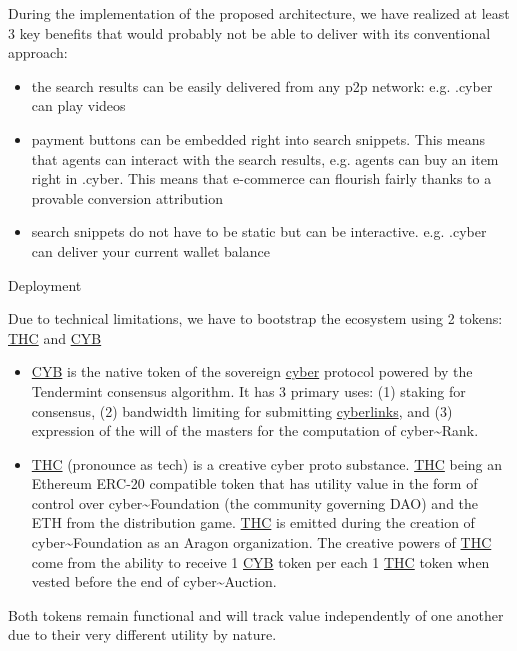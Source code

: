 \documentclass[8pt,oneside]{amsart}
\makeatletter
\newcommand{\linkred}[2]{\href{#1}{\color{red}{#2}}}
\renewcommand\subsection{\@startsection{subsection}
                                    {2}{\z@}
                                    {-3.25ex\@plus -1ex \@minus -.2ex}
                                    {0ex \@plus .2ex}
                                    {\play\Large}
                        }
\newcommand{\titleSection}[1]{\subsection{#1}}
\makeatother
\begin{document}
During the implementation of the proposed architecture, we have realized at least 3 key benefits that \linkred{https://google.com}{Google} would probably not be able to deliver with its conventional approach:

\begin{itemize}
\item the search results can be easily delivered from any p2p network: e.g. .cyber can play videos
\item payment buttons can be embedded right into search snippets. This means that agents can interact with the search results, e.g. agents can buy an item right in .cyber. This means that e-commerce can flourish fairly thanks to a provable conversion attribution
\item search snippets do not have to be static but can be interactive. e.g. .cyber can deliver your current wallet balance
\end{itemize}

\titleSection{Deployment}\label{deployment}

Due to technical limitations, we have to bootstrap the ecosystem using 2 tokens: {\hyperref[thc]{THC}} and {\hyperref[cyb]{CYB}}

\begin{itemize}
\item {\hyperref[cyb]{CYB}} is the native token of the sovereign {\hyperref[cyber]{cyber}} protocol powered by the Tendermint consensus algorithm. It has 3 primary uses: (1) staking for consensus, (2) bandwidth limiting for submitting {\hyperref[cyberlinks]{cyberlinks}}, and (3) expression of the will of the masters for the computation of cyber\~{}Rank.

\item {\hyperref[thc]{THC}} (pronounce as tech) is a creative cyber proto substance. {\hyperref[thc]{THC}} being an Ethereum ERC-20 compatible token that has utility value in the form of control over cyber\~{}Foundation (the community governing DAO) and the ETH from the distribution game. {\hyperref[thc]{THC}} is emitted during the creation of cyber\~{}Foundation as an Aragon organization. The creative powers of {\hyperref[thc]{THC}} come from the ability to receive 1 {\hyperref[cyb]{CYB}} token per each 1 {\hyperref[thc]{THC}} token when vested before the end of cyber\~{}Auction.
\end{itemize}

Both tokens remain functional and will track value independently of one another due to their very different utility by nature.
\end{document}
